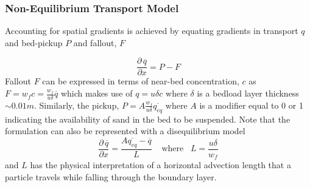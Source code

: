 \documentclass[aspectratio=169]{beamer}
\newcommand{\pdv}[2]{\frac{\partial \, #1}{\partial #2}}
\begin{document}
\begin{frame}
  \frametitle{Non-Equilibrium Transport Model} 

  Accounting for spatial gradients is achieved by equating gradients
  in transport $q$ and bed-pickup $P$ and fallout, $F$

  \begin{equation*}
    \pdv{\overline{q}}{x} = P-F 
  \end{equation*}
Fallout $F$ can be expressed in terms of near-bed concentration, $c$
as $F = w_f c = \frac{w_f}{u \delta} \overline{q} $ which makes use of
$q = u \delta c$ where $\delta$ is a bedload layer thickness $\sim 0.01m$.
Similarly, the pickup, $P = A \frac{w_f}{u \delta} \overline{q_{eq}}$
where $A$ is a modifier equal to 0 or 1 indicating the availability of sand in the bed
to be suspended.  Note that the formulation can also be represented with a disequilibrium model 
  \begin{equation*}
    \pdv{\overline{q}}{x} = \frac{A \overline{q_{eq}}  - \overline{q}}{L} \;\;\;\;\mbox{where}\;\;\; L = \frac{u \delta}{w_f}
  \end{equation*}
and $L$ has the physical interpretation of a horizontal advection
length that a particle travels while falling through the
boundary layer.


  


\end{frame}
\end{document}
